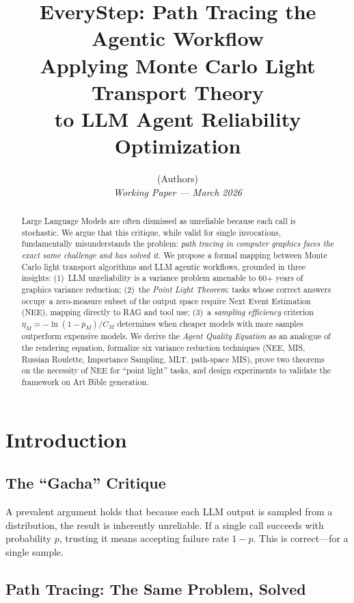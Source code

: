 \documentclass[11pt,twocolumn]{article}
\title{\textbf{EveryStep: Path Tracing the Agentic Workflow}\\[6pt]
  \large Applying Monte Carlo Light Transport Theory \\
  to LLM Agent Reliability Optimization}
\author{%
  (Authors)\\
  \textit{Working Paper --- March 2026}
}
\date{}
\theoremstyle{definition}
\begin{document}
\maketitle

\begin{abstract}
Large Language Models are often dismissed as unreliable because each call is stochastic.
We argue that this critique, while valid for single invocations, fundamentally misunderstands the problem:
\emph{path tracing in computer graphics faces the exact same challenge and has solved it.}
We propose a formal mapping between Monte Carlo light transport algorithms and LLM agentic workflows,
grounded in three insights:
(1)~LLM unreliability is a variance problem amenable to 60+ years of graphics variance reduction;
(2)~the \emph{Point Light Theorem}: tasks whose correct answers occupy a zero-measure subset of the output space
    require Next Event Estimation (NEE), mapping directly to RAG and tool use;
(3)~a \emph{sampling efficiency} criterion $\eta_M = -\ln(1-p_M)/C_M$ determines when cheaper models
    with more samples outperform expensive models.
We derive the \emph{Agent Quality Equation} as an analogue of the rendering equation,
formalize six variance reduction techniques
(NEE, MIS, Russian Roulette, Importance Sampling, MLT, path-space MIS),
prove two theorems on the necessity of NEE for ``point light'' tasks,
and design experiments to validate the framework on Art Bible generation.
\end{abstract}

\section{Introduction}\label{sec:intro}

\subsection{The ``Gacha'' Critique}

A prevalent argument holds that because each LLM output is sampled from a distribution,
the result is inherently unreliable.
If a single call succeeds with probability $p$,
trusting it means accepting failure rate $1-p$.
This is correct---for a single sample.

\subsection{Path Tracing: The Same Problem, Solved}
\end{document}
